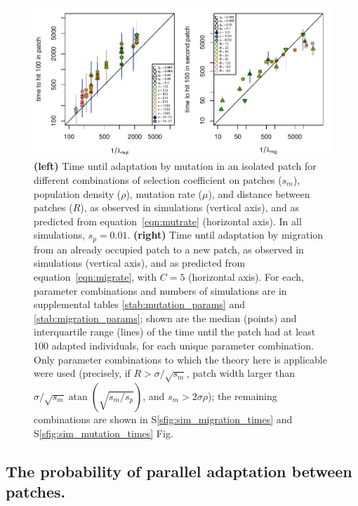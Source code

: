 \documentclass{article}
\DeclareMathOperator{\atan}{atan}
\begin{document}
\begin{figure}[ht!]
  \begin{center}
      \includegraphics{times-predicted-observed}
  \end{center}
  \caption{
      \textbf{(left)} 
      Time until adaptation by mutation in an isolated patch for different combinations
      of selection coefficient on patches ($s_m$), 
      population density ($\rho$),
      mutation rate ($\mu$),
      and distance between patches ($R$),
      as observed in simulations (vertical axis),
      and as predicted from equation~\eqref{eqn:mutrate} (horizontal axis).
      In all simulations, $s_p=0.01$.
      \textbf{(right)} 
      Time until adaptation by migration from an already occupied patch to a new patch,
      as observed in simulations (vertical axis),
      and as predicted from equation~\eqref{eqn:migrate}, with $C=5$ (horizontal axis).
      For each,
      parameter combinations and numbers of simulations are in supplemental tables \ref{stab:mutation_params} and \ref{stab:migration_params};
      shown are the median (points) and interquartile range (lines)
      of the time until the patch had at least 100 adapted individuals,
      for each unique parameter combination.
      Only parameter combinations to which the theory here is applicable were used
      (precisely, if
      $R > \sigma/\sqrt{s_m}$, 
      patch width larger than $\sigma/\sqrt{s_m} \atan(\sqrt{s_m/s_p})$, 
      and $s_m > 2 \sigma \rho$);
      the remaining combinations are shown in 
      S\ref{sfig:sim_migration_times} and S\ref{sfig:sim_mutation_times} Fig.
  }   \label{fig:sim_times}
\end{figure}




\subsection[Probability of Parallel Adaptation]{The probability of parallel adaptation between patches.} 
\label{ss:probparallel}
\end{document}
